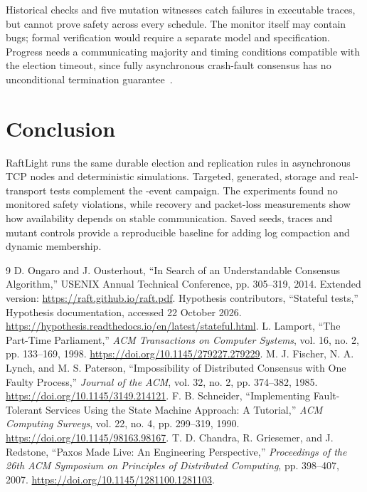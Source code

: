 \documentclass[10pt,a4paper]{article}
\begin{document}
Historical checks and five mutation witnesses catch failures in executable
traces, but cannot prove safety across every schedule. The monitor itself may
contain bugs; formal verification would require a separate model and
specification. Progress needs a communicating majority and timing conditions
compatible with the election timeout, since fully asynchronous crash-fault
consensus has no unconditional termination guarantee~\cite{flp}.

\section{Conclusion}
RaftLight runs the same durable election and replication rules in asynchronous
TCP nodes and deterministic simulations. Targeted, generated, storage and
real-transport tests complement the \FaultCount{}-event campaign. The experiments
found no monitored safety violations, while recovery and packet-loss measurements
show how availability depends on stable communication. Saved seeds, traces and
mutant controls provide a reproducible baseline for adding log compaction and
dynamic membership.

\begin{thebibliography}{9}
 D. Ongaro and J. Ousterhout, ``In Search of an Understandable
Consensus Algorithm,'' USENIX Annual Technical Conference, pp. 305--319, 2014.
Extended version: \url{https://raft.github.io/raft.pdf}.
 Hypothesis contributors, ``Stateful tests,'' Hypothesis
documentation, accessed 22 October 2026.
\url{https://hypothesis.readthedocs.io/en/latest/stateful.html}.
 L. Lamport, ``The Part-Time Parliament,''
\emph{ACM Transactions on Computer Systems}, vol. 16, no. 2, pp. 133--169, 1998.
\url{https://doi.org/10.1145/279227.279229}.
 M. J. Fischer, N. A. Lynch, and M. S. Paterson,
``Impossibility of Distributed Consensus with One Faulty Process,''
\emph{Journal of the ACM}, vol. 32, no. 2, pp. 374--382, 1985.
\url{https://doi.org/10.1145/3149.214121}.
 F. B. Schneider, ``Implementing Fault-Tolerant Services Using
the State Machine Approach: A Tutorial,'' \emph{ACM Computing Surveys},
vol. 22, no. 4, pp. 299--319, 1990.
\url{https://doi.org/10.1145/98163.98167}.
 T. D. Chandra, R. Griesemer, and J. Redstone,
``Paxos Made Live: An Engineering Perspective,''
\emph{Proceedings of the 26th ACM Symposium on Principles of Distributed Computing},
pp. 398--407, 2007. \url{https://doi.org/10.1145/1281100.1281103}.
\end{thebibliography}
\end{document}
